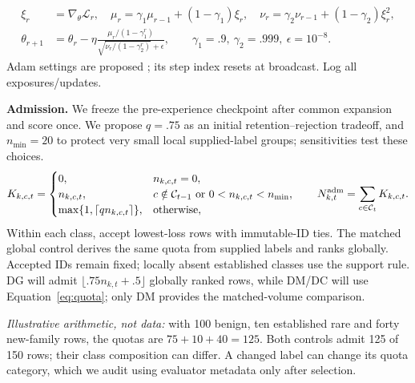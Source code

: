 \documentclass[10pt,a4paper]{article}
\begin{document}
\begin{equation}
\begin{aligned}
\xi_r&=\nabla_\theta\mathcal L_r,\quad\mu_r=\gamma_1\mu_{r-1}+(1-\gamma_1)\xi_r,\quad
\nu_r=\gamma_2\nu_{r-1}+(1-\gamma_2)\xi_r^2,\\
\theta_{r+1}&=\theta_r-\eta\frac{\mu_r/(1-\gamma_1^r)}{\sqrt{\nu_r/(1-\gamma_2^r)}+\epsilon},\qquad
\gamma_1=.9,\ \gamma_2=.999,\ \epsilon=10^{-8}.
\end{aligned}
\label{eq:adam}
\end{equation}
Adam settings are proposed \cite{adam}; its step index resets at broadcast. Log all exposures/updates.

\textbf{Admission.} We freeze the pre-experience checkpoint after common expansion and score once. We propose $q=.75$ as an initial retention--rejection tradeoff, and $n_{\min}=20$ to protect very small local supplied-label groups; sensitivities test these choices.
\begin{equation}
K_{k,c,t}=\begin{cases}
0,&n_{k,c,t}=0,\\
n_{k,c,t},&c\notin\mathcal C_{t-1}\ \text{or}\ 0<n_{k,c,t}<n_{\min},\\
\max\{1,\lceil qn_{k,c,t}\rceil\},&\text{otherwise},
\end{cases}\qquad N^{\rm adm}_{k,t}=\sum_{c\in\mathcal C_t}K_{k,c,t}.
\label{eq:quota}
\end{equation}
Within each class, accept lowest-loss rows with immutable-ID ties. The matched global control derives the same quota from supplied labels and ranks globally. Accepted IDs remain fixed; locally absent established classes use the support rule. DG will admit $\lfloor .75n_{k,t}+.5\rfloor$ globally ranked rows, while DM/DC will use Equation~\eqref{eq:quota}; only DM provides the matched-volume comparison.

\emph{Illustrative arithmetic, not data:} with 100 benign, ten established rare and forty new-family rows, the quotas are $75+10+40=125$. Both controls admit 125 of 150 rows; their class composition can differ. A changed label can change its quota category, which we audit using evaluator metadata only after selection.
\end{document}

